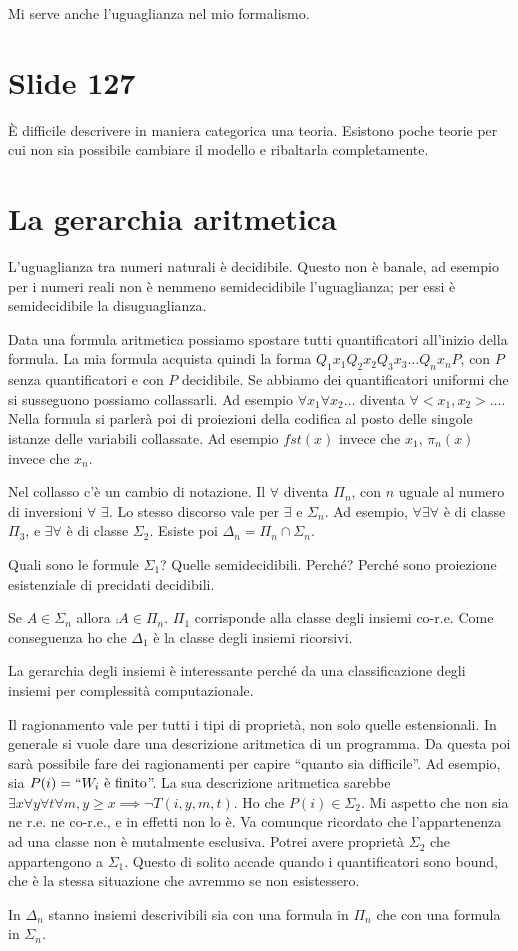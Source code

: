 Mi serve anche l'uguaglianza nel mio formalismo.

\section{Slide 127}

È difficile descrivere in maniera categorica una teoria. Esistono poche teorie per cui non sia
possibile cambiare il modello e ribaltarla completamente.

\section{La gerarchia aritmetica}

L'uguaglianza tra numeri naturali è decidibile. Questo non è banale, ad esempio per i numeri reali
non è nemmeno semidecidibile l'uguaglianza; per essi è semidecidibile la disuguaglianza.

Data una formula aritmetica possiamo spostare tutti quantificatori all'inizio della formula. La mia
formula acquista quindi la forma $Q_{1} x_{1} Q_{2} x_{2} Q_{3}x_{3} \dotsc Q_{n}x_{n}P$, con $P$ senza
quantificatori e con $P$ decidibile. Se abbiamo dei quantificatori uniformi che si susseguono possiamo
collassarli. Ad esempio $\forall x_{1} \forall x_{2} \dotsc$ diventa $\forall <x_{1},x_{2}> \dotsc$. Nella
formula si parlerà poi di proiezioni della codifica al posto delle singole istanze delle variabili
collassate. Ad esempio $\textit{fst}(x)$ invece che $x_{1}$, $\pi_{n}(x)$ invece che $x_{n}$.

Nel collasso c'è un cambio di notazione. Il $\forall$ diventa $\Pi_{n}$, con $n$ uguale al numero di
inversioni $\forall$ $\exists$. Lo stesso discorso vale per $\exists$ e $\Sigma_{n}$. Ad esempio,
$\forall \exists \forall$ è di classe $\Pi_{3}$, e $\exists \forall$ è di classe $\Sigma_{2}$. Esiste poi
$\Delta_{n} = \Pi_{n} \cap \Sigma_{n}$.

Quali sono le formule $\Sigma_{1}$? Quelle semidecidibili. Perché? Perché sono proiezione
esistenziale di precidati decidibili.

Se $A \in \Sigma_{n}$ allora $\comp{A} \in \Pi_{n}$. $\Pi_{1}$ corrisponde alla classe degli insiemi
co-r.e. Come conseguenza ho che $\Delta_{1}$ è la classe degli insiemi ricorsivi.

La gerarchia degli insiemi è interessante perché da una classificazione degli insiemi per
complessità computazionale.

Il ragionamento vale per tutti i tipi di proprietà, non solo quelle estensionali. In generale si
vuole dare una descrizione aritmetica di un programma. Da questa poi sarà possibile fare dei
ragionamenti per capire ``quanto sia difficile''. Ad esempio, sia $P(i) = ``W_{i} \text{ è
finito}$''. La sua
descrizione aritmetica sarebbe $\exists x \forall y \forall t \forall m, y \geq x \implies \lnot
T(i,y,m,t)$. Ho che $P(i) \in \Sigma_{2}$. Mi aspetto che non sia ne r.e. ne co-r.e., e in effetti non
lo è. Va comunque ricordato che l'appartenenza ad una classe non è mutalmente esclusiva. Potrei
avere proprietà $\Sigma_{2}$ che appartengono a $\Sigma_{1}$. Questo di solito accade quando i
quantificatori sono bound, che è la stessa situazione che avremmo se non esistessero.

In $\Delta_{n}$ stanno insiemi descrivibili sia con una formula in $\Pi_{n}$ che con una formula in
$\Sigma_{n}$.
